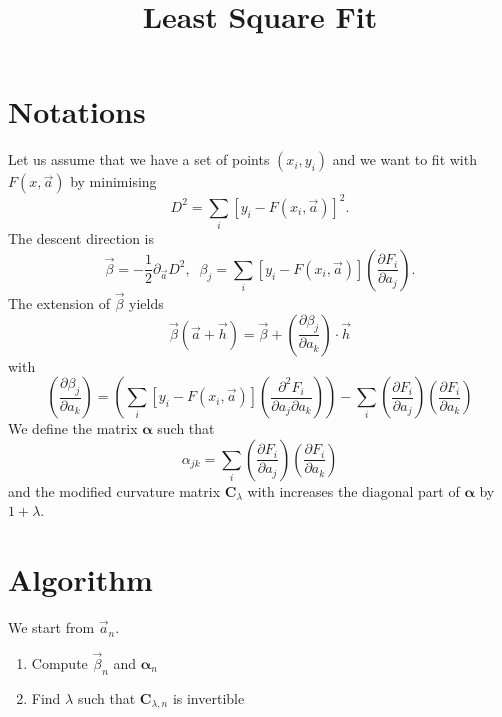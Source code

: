 \documentclass[aps]{revtex4}
\newcommand{\mymat}[1]{\boldsymbol{#1}}
\begin{document}
\title{Least Square Fit}
\maketitle
	
\section{Notations}
Let us assume that we have a set of points $(x_i,y_i)$ and we want to fit
with $F(x,\vec{a})$ by minimising
\begin{equation}
	D^2 = \sum_i\left[ y_i - F\left(x_i,\vec{a}\right)\right]^2.
\end{equation}
The descent direction is
\begin{equation}
	\vec{\beta} = -\dfrac{1}{2}\partial_{\vec{a}} D^2,
	 \;\; \beta_j = \sum_i \left[y_i - F\left(x_i,\vec{a}\right)\right] \left(\dfrac{\partial F_i}{\partial a_j}\right).
\end{equation}
The extension of $\vec\beta$ yields
\begin{equation}
	\vec{\beta}\left(\vec{a}+\vec{h}\right) = \vec{\beta} + \left(\dfrac{\partial \beta_j}{\partial a_k}\right) \cdot \vec{h}
\end{equation}
with
\begin{equation}
	\left(\dfrac{\partial \beta_j}{\partial a_k}\right) = 
	\left(
	 \sum_i \left[y_i - F\left(x_i,\vec{a}\right)\right] \left(\dfrac{\partial^2 F_i}{\partial a_j\partial a_k}\right)
	 \right) - \sum_i \left(\dfrac{\partial F_i}{\partial a_j}\right)\left(\dfrac{\partial F_i}{\partial a_k}\right)
\end{equation}
We define the matrix $\mymat{\alpha}$ such that
\begin{equation}
		\alpha_{jk} = \sum_i \left(\dfrac{\partial F_i}{\partial a_j}\right)\left(\dfrac{\partial F_i}{\partial a_k}\right)
\end{equation}
and the modified curvature matrix $\mymat{C}_\lambda$ with increases the diagonal part of $\mymat{\alpha}$ by $1+\lambda$.

\section{Algorithm}

We start from $\vec{a}_n$.
\begin{enumerate}
	\item Compute $\vec{\beta}_n$ and $\mymat{\alpha}_n$
	\item Find $\lambda$ such that $\mymat{C}_{\lambda,n}$ is invertible
\end{enumerate}
\end{document}
